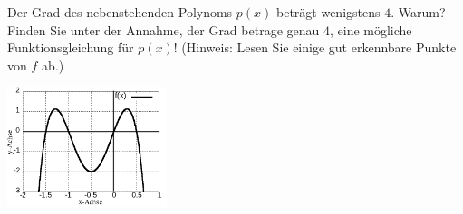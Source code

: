 \item

\begin{multicols}{2}

Der Grad des nebenstehenden Polynoms $p(x)$ beträgt wenigstens $4$. Warum? Finden Sie unter der Annahme, der Grad betrage genau $4$, eine mögliche Funktionsgleichung für $p(x)$! (Hinweis: Lesen Sie einige gut erkennbare Punkte von $f$ ab.) 

\columnbreak

\includegraphics[width=0.35\textwidth]{../pool/ex-graph-read-2-img-a.png}

\end{multicols}

